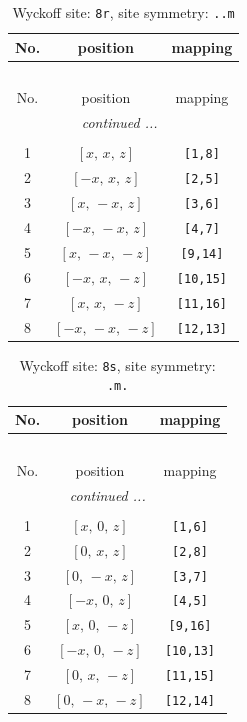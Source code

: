 \documentclass[fleqn,8pt]{jsarticle}
\begin{document}
\begin{longtable}{ccc}
\caption{Wyckoff site: {\tt 8r}, site symmetry: {\tt ..m}}
 \\
 \hline \hline
No. & position & mapping \\ \hline \endfirsthead

\multicolumn{2}{l}{\tablename\ \thetable{}} \\
 \hline \hline
No. & position & mapping \\ \hline \endhead

 \hline \hline
\multicolumn{2}{r}{\footnotesize\it continued ...} \\ \endfoot

 \hline \hline
\multicolumn{2}{r}{} \\ \endlastfoot

1 & $\left[ x,\, x,\, z \right]$ & {\tt [1,8]} \\ \hline
2 & $\left[ - x,\, x,\, z \right]$ & {\tt [2,5]} \\ \hline
3 & $\left[ x,\, - x,\, z \right]$ & {\tt [3,6]} \\ \hline
4 & $\left[ - x,\, - x,\, z \right]$ & {\tt [4,7]} \\ \hline
5 & $\left[ x,\, - x,\, - z \right]$ & {\tt [9,14]} \\ \hline
6 & $\left[ - x,\, x,\, - z \right]$ & {\tt [10,15]} \\ \hline
7 & $\left[ x,\, x,\, - z \right]$ & {\tt [11,16]} \\ \hline
8 & $\left[ - x,\, - x,\, - z \right]$ & {\tt [12,13]} \\
\end{longtable}
\renewcommand{\arraystretch}{1.2}
\begin{longtable}{ccc}
\caption{Wyckoff site: {\tt 8s}, site symmetry: {\tt .m.}}
 \\
 \hline \hline
No. & position & mapping \\ \hline \endfirsthead

\multicolumn{2}{l}{\tablename\ \thetable{}} \\
 \hline \hline
No. & position & mapping \\ \hline \endhead

 \hline \hline
\multicolumn{2}{r}{\footnotesize\it continued ...} \\ \endfoot

 \hline \hline
\multicolumn{2}{r}{} \\ \endlastfoot

1 & $\left[ x,\, 0,\, z \right]$ & {\tt [1,6]} \\ \hline
2 & $\left[ 0,\, x,\, z \right]$ & {\tt [2,8]} \\ \hline
3 & $\left[ 0,\, - x,\, z \right]$ & {\tt [3,7]} \\ \hline
4 & $\left[ - x,\, 0,\, z \right]$ & {\tt [4,5]} \\ \hline
5 & $\left[ x,\, 0,\, - z \right]$ & {\tt [9,16]} \\ \hline
6 & $\left[ - x,\, 0,\, - z \right]$ & {\tt [10,13]} \\ \hline
7 & $\left[ 0,\, x,\, - z \right]$ & {\tt [11,15]} \\ \hline
8 & $\left[ 0,\, - x,\, - z \right]$ & {\tt [12,14]} \\
\end{longtable}
\end{document}
